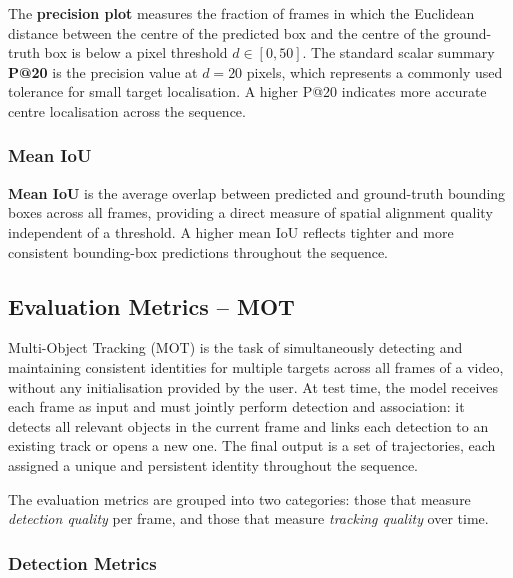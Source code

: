 \documentclass[
]{article}
\begin{document}
The \textbf{precision plot} measures the fraction of frames in which the Euclidean distance between the centre of the predicted box and the centre of the ground-truth box is below a pixel threshold $d \in [0, 50]$. The standard scalar summary \textbf{P@20} is the precision value at $d = 20$ pixels, which represents a commonly used tolerance for small target localisation. A higher P@20 indicates more accurate centre localisation across the sequence.

\subsubsection*{Mean IoU}

\textbf{Mean IoU} is the average overlap between predicted and ground-truth bounding boxes across all frames, providing a direct measure of spatial alignment quality independent of a threshold. A higher mean IoU reflects tighter and more consistent bounding-box predictions throughout the sequence.

\hypertarget{Evaluation Metrics - MOT}{%
\subsection{Evaluation Metrics -- MOT}\label{Evaluation Metrics - MOT}}

Multi-Object Tracking (MOT) is the task of simultaneously detecting and maintaining consistent identities for multiple targets across all frames of a video, without any initialisation provided by the user. At test time, the model receives each frame as input and must jointly perform detection and association: it detects all relevant objects in the current frame and links each detection to an existing track or opens a new one. The final output is a set of trajectories, each assigned a unique and persistent identity throughout the sequence.


The evaluation metrics are grouped into two categories: those that measure \emph{detection quality} per frame, and those that measure \emph{tracking quality} over time.

\subsubsection*{Detection Metrics}
\end{document}

